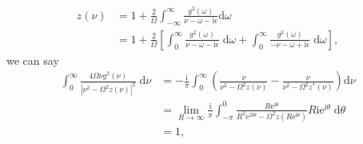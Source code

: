\begin{equation}
\begin{split}
z(\nu) &= 1 + \frac{2}{\Omega}\int_{-\infty}^\infty \frac{g^2(\omega)}{\nu - \omega - \mathrm{i}\epsilon}\mathrm{d}\omega\\
&= 1 + \frac{2}{\Omega}\left[\int_0^\infty \frac{g^2(\omega)}{\nu - \omega - \mathrm{i}\epsilon}\;\mathrm{d}\omega + \int^{\infty}_{0} \frac{g^2(\omega)}{-\nu - \omega + \mathrm{i}\epsilon}\;\mathrm{d}\omega\right],
\end{split}
\end{equation}
we can say
\begin{equation}\label{eq:qq-minus-ss-integral}
\begin{split}
\int_{0}^\infty\frac{4\Omega\nu g^2(\nu)}{|\nu^2 - \Omega^2z(\nu)|^2}\;\mathrm{d}\nu &= -\frac{\mathrm{i}}{\pi}\int_0^\infty\left(\frac{\nu}{\nu^2 - \Omega^2z(\nu)} - \frac{\nu}{\nu^2 - \Omega^2z^*(\nu)}\right)\mathrm{d}\nu\\
&= \lim_{R\to\infty}\frac{\mathrm{i}}{\pi}\int_{-\pi}^0\frac{R\mathrm{e}^{\mathrm{i}\theta}}{R^2\mathrm{e}^{2\mathrm{i}\theta} - \Omega^2z(R\mathrm{e}^{\mathrm{i}\theta})}R\mathrm{i}\mathrm{e}^{\mathrm{i}\theta}\;\mathrm{d}\theta\\
&= 1,
\end{split}
\end{equation}
